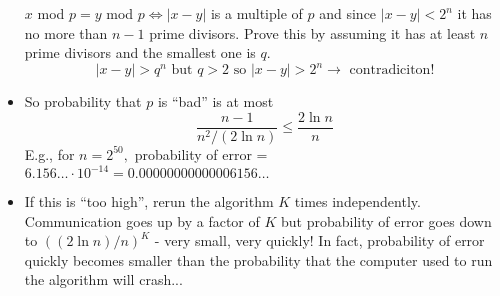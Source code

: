 \begin{itemize}
 	$x$ mod $p = y$ mod $p \Leftrightarrow |x-y|$ is a multiple of $p$ and since $|x-y| < 2^n$ it has no more than $n-1$ prime divisors. Prove this by assuming it has at least $n$ prime divisors and the smallest one is $q$.
 	$$|x-y| > q^n \textrm{ but } q>2 \textrm{ so } |x-y| > 2^n \rightarrow \textrm{ contradiciton!}$$
 	\item So probability that $p$ is ``bad'' is at most
 	$$ \frac{n-1}{n^2 / (2 \ln n)} \leq \frac{2 \ln n}{n}$$
 	E.g., for $n=2^{50},$ probability of error = $6.156\ldots \cdot 10^{-14} = 0.00000000000006156\ldots$
 	\item If this is ``too high'', rerun the algorithm $K$ times independently. Communication goes up by a factor of $K$ but probability of error goes down to $((2 \ln n)/n)^K$ - very small, very quickly! In fact, probability of error quickly becomes smaller than the probability that the computer used to run the algorithm will crash...
\end{itemize}  

